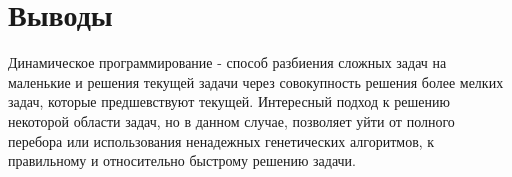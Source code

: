 \section{Выводы}

Динамическое программирование - способ разбиения сложных задач на маленькие и решения текущей задачи через совокупность решения более мелких задач, которые предшевствуют текущей. Интересный подход к решению некоторой области задач, но в данном случае, позволяет уйти от полного перебора или использования ненадежных генетических алгоритмов, к правильному и относительно быстрому решению задачи. 
\pagebreak